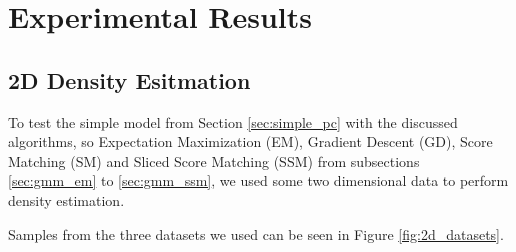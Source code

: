 \renewcommand{\vec}[1]{\textbf{#1}}

\chapter{Experimental Results}
\label{cha:experimental_results}

\section{2D Density Esitmation}

To test the simple model from Section \ref{sec:simple_pc} with the discussed algorithms, so Expectation Maximization (EM), 
Gradient Descent (GD), Score Matching (SM) and Sliced Score Matching (SSM) from subsections \ref{sec:gmm_em} to \ref{sec:gmm_ssm}, we used some 
two dimensional data to perform density estimation. 

Samples from the three datasets we used can be seen in Figure \ref{fig:2d_datasets}. \\

